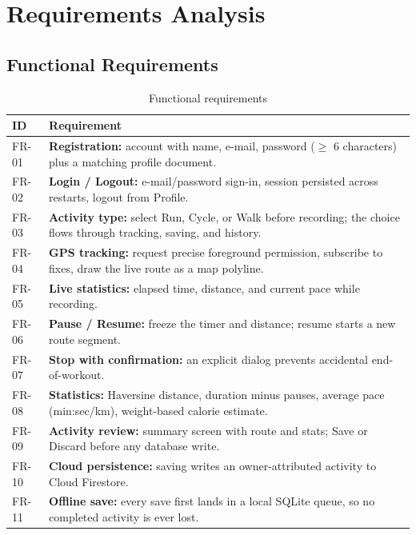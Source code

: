 \documentclass[12pt, a4paper]{report}
\begin{document}
\chapter{Requirements Analysis}

\section{Functional Requirements}
\begin{table}[H]
\centering
\caption{Functional requirements}
\label{tab:fr}
\small
\begin{tabularx}{\textwidth}{@{}l L@{}}
\toprule
\textbf{ID} & \textbf{Requirement} \\
\midrule
FR-01 & \textbf{Registration:} account with name, e-mail, password
        ($\geq$ 6 characters) plus a matching profile document. \\
FR-02 & \textbf{Login / Logout:} e-mail/password sign-in, session persisted
        across restarts, logout from Profile. \\
FR-03 & \textbf{Activity type:} select Run, Cycle, or Walk before recording;
        the choice flows through tracking, saving, and history. \\
FR-04 & \textbf{GPS tracking:} request precise foreground permission,
        subscribe to fixes, draw the live route as a map polyline. \\
FR-05 & \textbf{Live statistics:} elapsed time, distance, and current pace
        while recording. \\
FR-06 & \textbf{Pause / Resume:} freeze the timer and distance; resume starts
        a new route segment. \\
FR-07 & \textbf{Stop with confirmation:} an explicit dialog prevents
        accidental end-of-workout. \\
FR-08 & \textbf{Statistics:} Haversine distance, duration minus pauses,
        average pace (min:sec/km), weight-based calorie estimate. \\
FR-09 & \textbf{Activity review:} summary screen with route and stats;
        Save or Discard before any database write. \\
FR-10 & \textbf{Cloud persistence:} saving writes an owner-attributed
        activity to Cloud Firestore. \\
FR-11 & \textbf{Offline save:} every save first lands in a local SQLite
        queue, so no completed activity is ever lost. \\

\end{tabularx}
\end{table}
\end{document}
